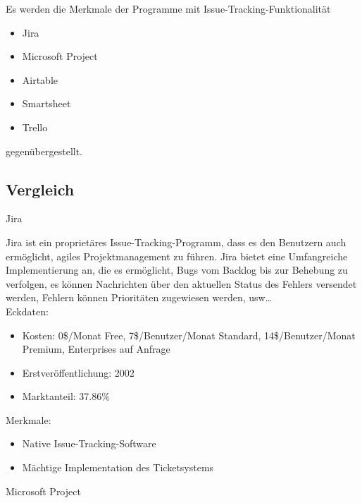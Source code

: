   Es werden die Merkmale der Programme mit Issue-Tracking-Funktionalität
		\begin{itemize}
			\item Jira
			\item Microsoft Project
			\item Airtable
			\item Smartsheet
			\item Trello
		\end{itemize}
gegenübergestellt.   

		\subsection{Vergleich}
		
			Jira
			
			Jira ist ein proprietäres Issue-Tracking-Programm, dass es den Benutzern auch ermöglicht, agiles Projektmanagement zu führen. Jira bietet eine Umfangreiche Implementierung an, die es ermöglicht, Bugs vom Backlog bis zur Behebung zu verfolgen, es können Nachrichten über den aktuellen Status des Fehlers versendet werden, Fehlern können Prioritäten zugewiesen werden, usw… \\
			
			 Eckdaten:
				\begin{itemize}
					\item Kosten: 0\$/Monat Free, 7\$/Benutzer/Monat Standard, 14\$/Benutzer/Monat Premium, Enterprises auf Anfrage
					\item Erstveröffentlichung: 2002
					\item Marktanteil: 37.86\%
				\end{itemize}
				
				Merkmale:
				\begin{itemize}
					\item Native Issue-Tracking-Software
					\item Mächtige Implementation des Ticketsystems
				\end{itemize}
				

				
				
				Microsoft Project
				
